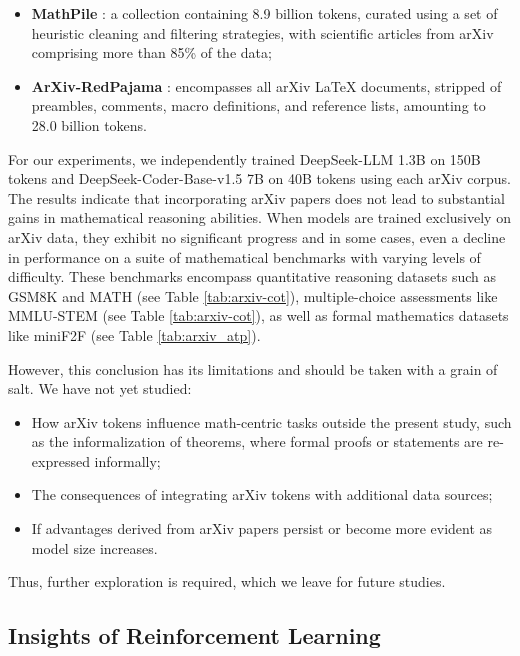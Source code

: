 \begin{itemize}[topsep=0pt]
\begin{itemize}[topsep=0pt]
    \item \textbf{MathPile} \citep{mathpile}: a collection containing 8.9 billion tokens, curated using a set of heuristic cleaning and filtering strategies, with scientific articles from arXiv comprising more than 85\% of the data;
    \item \textbf{ArXiv-RedPajama} \citep{redpajama}: encompasses all arXiv LaTeX documents, stripped of preambles, comments, macro definitions, and reference lists, amounting to 28.0 billion tokens.
\end{itemize}

For our experiments, we independently trained DeepSeek-LLM 1.3B on 150B tokens and DeepSeek-Coder-Base-v1.5 7B on 40B tokens using each arXiv corpus. The results indicate that incorporating arXiv papers does not lead to substantial gains in mathematical reasoning abilities. When models are trained exclusively on arXiv data, they exhibit no significant progress and in some cases, even a decline in performance on a suite of mathematical benchmarks with varying levels of difficulty. These benchmarks encompass quantitative reasoning datasets such as GSM8K and MATH (see Table \ref{tab:arxiv-cot}), multiple-choice assessments like MMLU-STEM (see Table \ref{tab:arxiv-cot}), as well as formal mathematics datasets like miniF2F (see Table \ref{tab:arxiv_atp}).

However, this conclusion has its limitations and should be taken with a grain of salt. We have not yet studied:

\begin{itemize}[topsep=0pt]
    \item How arXiv tokens influence math-centric tasks outside the present study, such as the informalization of theorems, where formal proofs or statements are re-expressed informally;
    \item The consequences of integrating arXiv tokens with additional data sources;
    \item If advantages derived from arXiv papers persist or become more evident as model size increases.
\end{itemize}

Thus, further exploration is required, which we leave for future studies.

\subsection{Insights of Reinforcement Learning}

\end{itemize}

